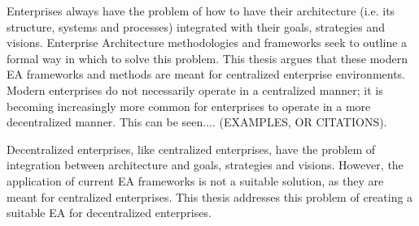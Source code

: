 
Enterprises always have the problem of how to have their architecture (i.e. its structure, systems and processes) integrated with their goals, strategies and visions. Enterprise Architecture methodologies and frameworks seek to outline a formal way in which to solve this problem. This thesis argues that these modern EA frameworks and methods are meant for centralized enterprise environments. Modern enterprises do not necessarily operate in a centralized manner; it is becoming increasingly more common for enterprises to operate in a more decentralized manner. This can be seen.... (EXAMPLES, OR CITATIONS).

Decentralized enterprises, like centralized enterprises, have the problem of integration between architecture and goals, strategies and visions.  However, the application of current EA frameworks is not a suitable solution, as they are meant for centralized enterprises. This thesis addresses this problem of creating a suitable EA for decentralized enterprises.